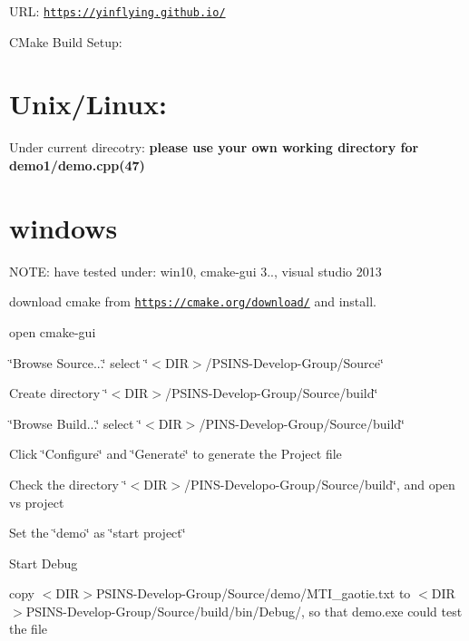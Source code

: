 U\+RL\+: \href{https://yinflying.github.io/}{\tt https\+://yinflying.\+github.\+io/}

C\+Make Build Setup\+:

\section*{Unix/\+Linux\+:}

Under current direcotry\+: {\bfseries please use your own working directory for demo1/demo.\+cpp(47)} 
 \section*{windows}

N\+O\+TE\+: have tested under\+: win10, cmake-\/gui 3.., visual studio 2013


\begin{DoxyEnumerate}
\item download cmake from \href{https://cmake.org/download/}{\tt https\+://cmake.\+org/download/} and install.
\item open cmake-\/gui
\item \char`\"{}\+Browse Source...\char`\"{} select \char`\"{}$<$\+D\+I\+R$>$/\+P\+S\+I\+N\+S-\/\+Develop-\/\+Group/\+Source\char`\"{}
\item Create directory \char`\"{}$<$\+D\+I\+R$>$/\+P\+S\+I\+N\+S-\/\+Develop-\/\+Group/\+Source/build\char`\"{}
\item \char`\"{}\+Browse Build...\char`\"{} select \char`\"{}$<$\+D\+I\+R$>$/\+P\+I\+N\+S-\/\+Develop-\/\+Group/\+Source/build\char`\"{}
\item Click \char`\"{}\+Configure\char`\"{} and \char`\"{}\+Generate\char`\"{} to generate the Project file
\item Check the directory \char`\"{}$<$\+D\+I\+R$>$/\+P\+I\+N\+S-\/\+Developo-\/\+Group/\+Source/build\char`\"{}, and open vs project
\item Set the \char`\"{}demo\char`\"{} as \char`\"{}start project\char`\"{}
\item Start Debug
\item copy $<$\+D\+I\+R$>$P\+S\+I\+N\+S-\/\+Develop-\/\+Group/\+Source/demo/\+M\+T\+I\+\_\+gaotie.\+txt to $<$\+D\+I\+R$>$P\+S\+I\+N\+S-\/\+Develop-\/\+Group/\+Source/build/bin/\+Debug/, so that demo.\+exe could test the file 
\end{DoxyEnumerate}